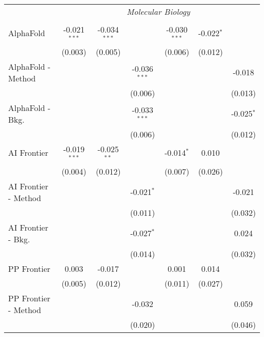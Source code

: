 \begin{tabular}{lcccccc}
 & \multicolumn{6}{c}{\textit{Molecular Biology}} \\ \\
   AlphaFold            & -0.021$^{***}$ & -0.034$^{***}$ &                & -0.030$^{***}$ & -0.022$^{*}$ &   \\   
                        & (0.003)        & (0.005)        &                & (0.006)        & (0.012)      &   \\   
   AlphaFold - Method   &                &                & -0.036$^{***}$ &                &              & -0.018\\   
                        &                &                & (0.006)        &                &              & (0.013)\\   
   AlphaFold - Bkg.     &                &                & -0.033$^{***}$ &                &              & -0.025$^{*}$\\   
                        &                &                & (0.006)        &                &              & (0.012)\\   
   AI Frontier          & -0.019$^{***}$ & -0.025$^{**}$  &                & -0.014$^{*}$   & 0.010        &   \\   
                        & (0.004)        & (0.012)        &                & (0.007)        & (0.026)      &   \\   
   AI Frontier - Method &                &                & -0.021$^{*}$   &                &              & -0.021\\   
                        &                &                & (0.011)        &                &              & (0.032)\\   
   AI Frontier - Bkg.   &                &                & -0.027$^{*}$   &                &              & 0.024\\   
                        &                &                & (0.014)        &                &              & (0.032)\\   
   PP Frontier          & 0.003          & -0.017         &                & 0.001          & 0.014        &   \\   
                        & (0.005)        & (0.012)        &                & (0.011)        & (0.027)      &   \\   
   PP Frontier - Method &                &                & -0.032         &                &              & 0.059\\   
                        &                &                & (0.020)        &                &              & (0.046)\\   

\end{tabular}
